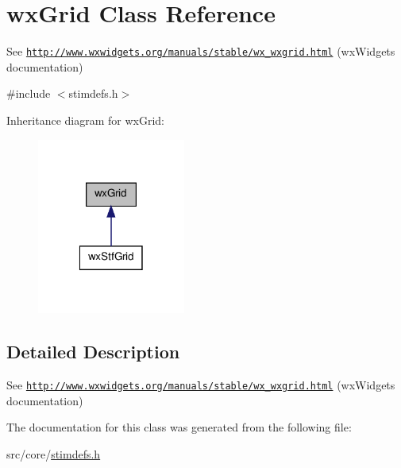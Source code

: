 \hypertarget{classwxGrid}{
\section{wxGrid Class Reference}
\label{classwxGrid}
}


See \href{http://www.wxwidgets.org/manuals/stable/wx_wxgrid.html}{\tt http://www.wxwidgets.org/manuals/stable/wx\_\-wxgrid.html} (wxWidgets documentation)  




{\ttfamily \#include $<$stimdefs.h$>$}



Inheritance diagram for wxGrid:
\nopagebreak
\begin{figure}[H]
\begin{center}
\leavevmode
\includegraphics[width=138pt]{classwxGrid__inherit__graph}
\end{center}
\end{figure}


\subsection{Detailed Description}
See \href{http://www.wxwidgets.org/manuals/stable/wx_wxgrid.html}{\tt http://www.wxwidgets.org/manuals/stable/wx\_\-wxgrid.html} (wxWidgets documentation) 

The documentation for this class was generated from the following file:\begin{DoxyCompactItemize}
\item 
src/core/\hyperlink{stimdefs_8h}{stimdefs.h}\end{DoxyCompactItemize}

